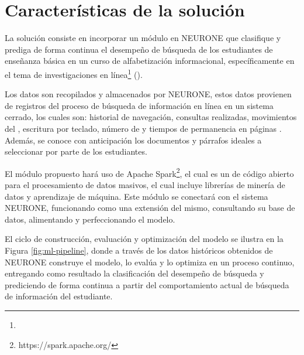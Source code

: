 \section{Características de la solución}
\label{sec:caracteristicas-solucion}
La solución consiste en incorporar un módulo en NEURONE \parencite{gonzalez2017neurone} que clasifique y prediga de forma continua el desempeño de búsqueda de los estudiantes de enseñanza básica en un curso de alfabetización informacional, específicamente en el tema de investigaciones en línea\footnote{\traduccionlibre} (). 

Los datos son recopilados y almacenados por NEURONE, estos datos provienen de registros del proceso de búsqueda de información en línea en un sistema cerrado, los cuales son: historial de navegación, consultas realizadas, movimientos del , escritura por teclado, número de  y tiempos de permanencia en páginas . Además, se conoce con anticipación los documentos y párrafos ideales a seleccionar por parte de los estudiantes.

El módulo propuesto hará uso de Apache Spark\footnote{https://spark.apache.org/}, el cual es un  de código abierto para el procesamiento de datos masivos, el cual incluye librerías de minería de datos y aprendizaje de máquina. Este módulo se conectará con el sistema NEURONE, funcionando como una extensión del mismo, consultando su base de datos, alimentando y perfeccionando el modelo. 

El ciclo de construcción, evaluación y optimización del modelo se ilustra en la Figura \ref{fig:ml-pipeline}, donde a través de los datos históricos obtenidos de NEURONE construye el modelo, lo evalúa y lo optimiza en un proceso continuo, entregando como resultado la clasificación del desempeño de búsqueda y prediciendo de forma continua a partir del comportamiento actual de búsqueda de información del estudiante.


